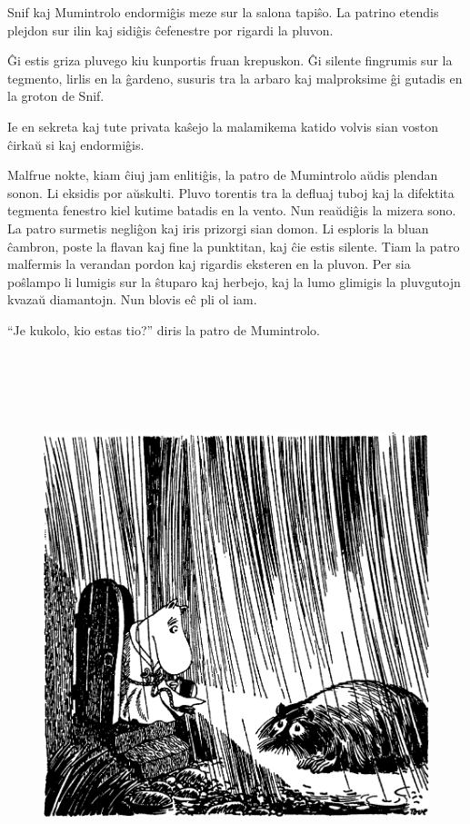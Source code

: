 Snif kaj Mumintrolo endormiĝis meze sur la salona tapiŝo. La patrino etendis plejdon sur ilin kaj sidiĝis ĉefenestre por rigardi la pluvon.

Ĝi estis griza pluvego kiu kunportis fruan krepuskon. Ĝi silente fingrumis sur la tegmento, lirlis en la ĝardeno, susuris tra la arbaro kaj malproksime ĝi gutadis en la groton de Snif.

Ie en sekreta kaj tute privata kaŝejo la malamikema katido volvis sian voston ĉirkaŭ si kaj endormiĝis.

\sectionbreak

Malfrue nokte, kiam ĉiuj jam enlitiĝis, la patro de Mumintrolo aŭdis plendan sonon. Li eksidis por aŭskulti. Pluvo torentis tra la defluaj tuboj kaj la difektita tegmenta fenestro kiel kutime batadis en la vento. Nun reaŭdiĝis la mizera sono. La patro surmetis negliĝon kaj iris prizorgi sian domon. Li esploris la bluan ĉambron, poste la flavan kaj fine la punktitan, kaj ĉie estis silente. Tiam la patro malfermis la verandan pordon kaj rigardis eksteren en la pluvon. Per sia poŝlampo li lumigis sur la ŝtuparo kaj herbejo, kaj la lumo glimigis la pluvgutojn kvazaŭ diamantojn. Nun blovis eĉ pli ol iam.

``Je kukolo, kio estas tio?'' diris la patro de Mumintrolo.

\begin{figure}[htbp]
\centering
\includegraphics[width=450pt,height=450pt]{1-10.png}
\caption{}
\label{1-10}
\end{figure}

